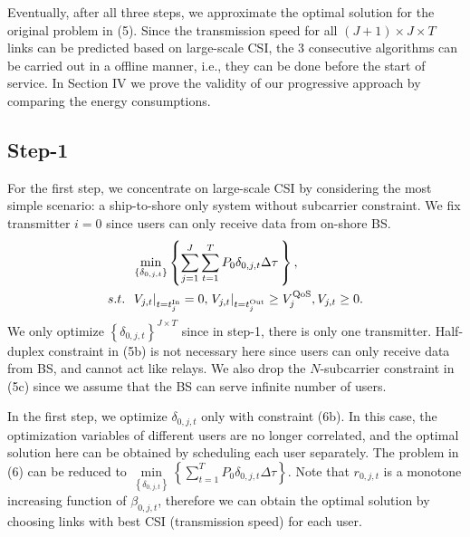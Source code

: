 \documentclass[conference]{IEEEtran}
\begin{document}
 Eventually, after all three steps, we approximate the optimal solution for the original problem in (5). Since the transmission speed for all $\left( J+1 \right) \times J \times T$ links can be predicted based on large-scale CSI, the 3 consecutive algorithms can be carried out in a offline manner, i.e., they can be done before the start of service. In Section IV we prove the validity of our progressive approach by comparing the energy consumptions. 
 
 \subsection{Step-1}
 
 For the first step, we concentrate on large-scale CSI by considering the most simple scenario: a ship-to-shore only system without subcarrier constraint. We fix transmitter $i = 0$ since users can only receive data from on-shore BS. 
 \begin{subequations}
 \begin{align}
 & \mathop {\min }\limits_{\left\{ {{\delta _{0,j,t}}} \right\}} \left\{ {\sum\limits_{j = 1}^J {\sum\limits_{t = 1}^{T} {{P_{0}}\delta _{0,j,t} \Delta \tau } \,} } \right\} ,\\
  {s.t.} \;\; &{{{\left. {{V_{j,t}}} \right|}_{t = t_j^{{\rm{In}}}}} = 0,\left. { {V_{j,t}}} \right|_{t = t_j^{{\rm{Out}}}}} \ge V_j^{\rm{QoS}}, {V_{j,t}} \ge 0.
 \end{align}
 \end{subequations}
 We only optimize $\left\{ {{\delta _{0,j,t}}} \right\}^{J \times T}$ since in step-1, there is only one transmitter. 
 Half-duplex constraint in (5b) is not necessary here since users can only receive data from BS, and cannot act like relays. We also drop the $N$-subcarrier constraint in (5c) since we assume that the BS can serve infinite number of users. 
 
 In the first step, we optimize ${\delta _{0,j,t}}$ only with constraint (6b). In this case, the optimization variables of different users are no longer correlated, and the optimal solution here can be obtained by scheduling each user separately. The problem in (6) can be reduced to $\mathop {\min }\limits_{{\left\{ {{\delta _{0,j,t}}} \right\}}} \left\{ {\sum\limits_{t = 1}^T {{P_{0}}\delta _{0,j,t} \Delta \tau } } \right\}$. Note that ${r_{0,j,t}}$ is a monotone increasing function of ${\beta _{0,j,t}}$, therefore we can obtain the optimal solution by choosing links with best CSI (transmission speed) for each user. 
 
\end{document}
